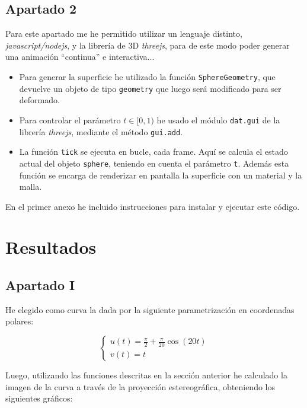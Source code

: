 \documentclass[10pt, spanish]{article}
\theoremstyle{definition}
\theoremstyle{break}
\begin{document}
\subsection{Apartado 2}

Para este apartado me he permitido utilizar un lenguaje distinto,
\textit{javascript/nodejs}, y la librería de 3D \textit{threejs}, para de este modo
poder generar una animación ``continua'' e interactiva...


\begin{itemize}
    \item Para generar la superficie he utilizado la función
        \texttt{SphereGeometry}, que devuelve un objeto de tipo
        \texttt{geometry} que luego será modificado para ser deformado.
    \item Para controlar el parámetro $t\in[0,1)$ he usado el módulo
        \texttt{dat.gui} de la librería \textit{threejs}, mediante el método
        \texttt{gui.add}.
    \item La función \texttt{tick} se ejecuta en bucle, cada frame. Aquí se
        calcula el estado actual del objeto \texttt{sphere}, teniendo en cuenta
        el parámetro \texttt{t}. Además esta función se encarga de renderizar en
        pantalla la superficie con un material y la malla.
\end{itemize}

En el primer anexo he incluido instrucciones para instalar y ejecutar este
código.

\section{Resultados}
\subsection{Apartado I}

He elegido como curva la dada por la siguiente parametrización en coordenadas polares:

\[\begin{cases}
    u(t) = \frac{\pi}{2}+\frac{\pi}{20}\cos(20t)\\
    v(t) = t
    \end{cases}\]

Luego, utilizando las funciones descritas en la sección anterior he calculado la
imagen de la curva a través de la proyección estereográfica, obteniendo los
siguientes gráficos:

\makebox[\textwidth][c]{\scalebox{0.5}{}}
\end{document}
